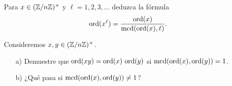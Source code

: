 \documentclass{article}
\begin{document}
\begin{problema}
  Para $x \in (\mathbb{Z}/n\mathbb{Z})^\times$ y $\ell = 1,2,3,\ldots$ deduzca la fórmula
  $$\operatorname{ord} (x^\ell) = \frac{\operatorname{ord} (x)}{\operatorname{mcd} (\operatorname{ord} (x), \ell)}.$$
\end{problema}

\begin{problema}
  Consideremos $x,y \in (\mathbb{Z}/n\mathbb{Z})^\times$.

  \begin{itemize}
  \item[a)] Demuestre que $\operatorname{ord} (xy) = \operatorname{ord}(x) \, \operatorname{ord}(y)$ si
    $\operatorname{mcd} (\operatorname{ord}(x), \operatorname{ord}(y)) = 1$.
  \item[b)] ¿Qué pasa si $\operatorname{mcd} (\operatorname{ord}(x), \operatorname{ord}(y)) \ne 1$?
  \end{itemize}
\end{problema}
\end{document}
